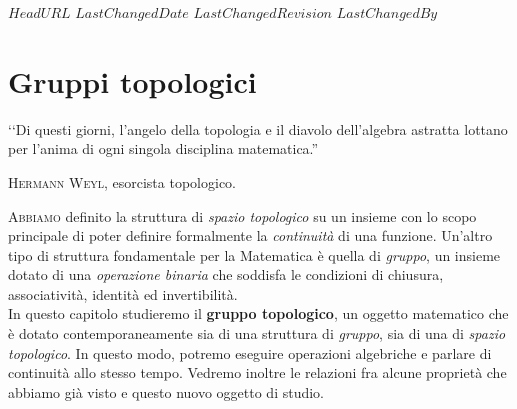 \svnidlong
{$HeadURL$}
{$LastChangedDate$}
{$LastChangedRevision$}
{$LastChangedBy$}

\chapter{Gruppi topologici}

\begin{introduction}
‘‘Di questi giorni, l'angelo della topologia e il diavolo dell'algebra astratta lottano per l'anima di ogni singola disciplina matematica.''
\begin{flushright}
	\textsc{Hermann Weyl,} esorcista topologico.
\end{flushright}
\end{introduction}
\lettrine[findent=1pt, nindent=0pt]{A}{bbiamo} definito la struttura di \textit{spazio topologico} su un insieme con lo scopo principale di poter definire formalmente la \textit{continuità} di una funzione. Un'altro tipo di struttura fondamentale per la Matematica è quella di \textit{gruppo}, un insieme dotato di una \textit{operazione binaria} che soddisfa le condizioni di chiusura, associatività, identità ed invertibilità.\\
In questo capitolo studieremo il \textbf{gruppo topologico}, un oggetto matematico che è dotato contemporaneamente sia di una struttura di \textit{gruppo}, sia di una di \textit{spazio topologico}. In questo modo, potremo eseguire operazioni algebriche e parlare di continuità allo stesso tempo. Vedremo inoltre le relazioni fra alcune proprietà che abbiamo già visto e questo nuovo oggetto di studio.
